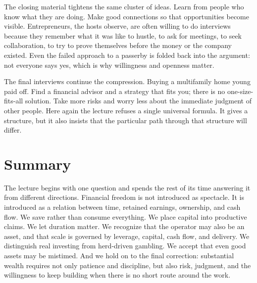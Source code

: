 The closing material tightens the same cluster of ideas. Learn from people who know what they are doing. Make good connections so that opportunities become visible. Entrepreneurs, the hosts observe, are often willing to do interviews because they remember what it was like to hustle, to ask for meetings, to seek collaboration, to try to prove themselves before the money or the company existed. Even the failed approach to a passerby is folded back into the argument: not everyone says yes, which is why willingness and openness matter.

The final interviews continue the compression. Buying a multifamily home young paid off. Find a financial advisor and a strategy that fits you; there is no one-size-fits-all solution. Take more risks and worry less about the immediate judgment of other people. Here again the lecture refuses a single universal formula. It gives a structure, but it also insists that the particular path through that structure will differ.

\section{Summary}

The lecture begins with one question and spends the rest of its time answering it from different directions. Financial freedom is not introduced as spectacle. It is introduced as a relation between time, retained earnings, ownership, and cash flow. We save rather than consume everything. We place capital into productive claims. We let duration matter. We recognize that the operator may also be an asset, and that scale is governed by leverage, capital, cash flow, and delivery. We distinguish real investing from herd-driven gambling. We accept that even good assets may be mistimed. And we hold on to the final correction: substantial wealth requires not only patience and discipline, but also risk, judgment, and the willingness to keep building when there is no short route around the work.
